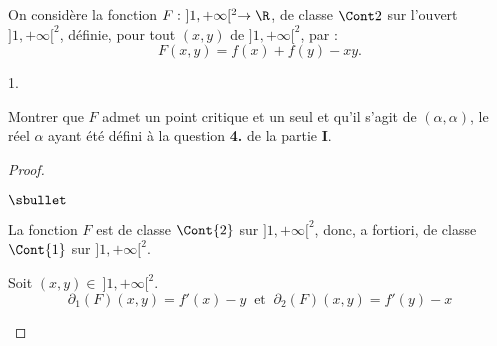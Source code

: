 \documentclass[11pt]{article}%
\begin{document}
\noindent
On considère la fonction $F: \ ]1,+\infty[^2 \rightarrow \R$, de classe 
$\Cont 2$ sur l'ouvert $]1,+\infty[^2$, définie, pour tout $(x,y)$ de 
$]1,+\infty[^2$, par :
\[
F(x,y)=f(x)+f(y)-xy.
\]
\begin{noliste}{1.}
\setlength{\itemsep}{2mm}
\setcounter{enumi}{12}
\item Montrer que $F$ admet un point critique et un seul et qu'il 
s'agit 
de $(\alpha,\alpha)$, le réel $\alpha$ ayant été défini à la question 
{\bf 4.} de la partie {\bf I}.

\begin{proof}~
\begin{noliste}{$\sbullet$}
\item La fonction $F$ est de classe $\Cont{2}$ sur $]1,+\infty[^2$, 
donc, a fortiori, de classe $\Cont{1}$ sur $]1,+\infty[^2$.

\item Soit $(x,y)\in \ ]1,+\infty[^2$.
\[
\partial_1(F)(x,y)=f'(x)-y \ \mbox{ et } \ \partial_2(F)(x,y)=f'(y)-x
\]


\end{noliste}
\end{proof}
\end{noliste}
\end{document}
